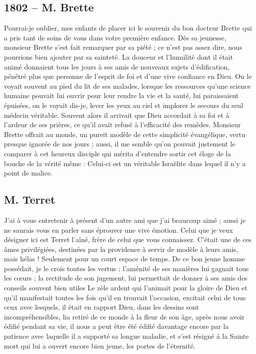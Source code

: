 \documentclass[11pt,a4paper]{report}
\begin{document}
\subsection*{1802 -- M. Brette}

Pourrai-je oublier, mes enfants de placer ici le souvenir du bon docteur Brette qui a pris tant de soins de vous dans votre première enfance. Dès sa jeunesse, monsieur Brette s'est fait remarquer par sa piété ; ce n'est pas assez dire, nous pourrions bien ajouter par sa sainteté. La douceur et l'humilité dont il était animé donnaient tous les jours à ses amis de nouveaux sujets d'édification, pénétré plus que personne de l'esprit de foi et d'une vive confiance en Dieu. On le voyait souvent au pied du lit de ses malades, lorsque les ressources qu'une science humaine pouvait lui ouvrir pour leur rendre la vie et la santé, lui paraissaient épuisées, on le voyait dis-je, lever les yeux au ciel et implorer le secours du seul médecin véritable. Souvent alors il arrivait que Dieu accordait à sa foi et à l'ardeur de ses prières, ce qu'il avait refusé à l'efficacité des remèdes. Monsieur Brette offrait au monde, un pureit modèle de cette simplicité évangélique, vertu presque ignorée de nos jours ; aussi, il me semble qu'on pouvait justement le comparer à cet heureux disciple qui mérita d'entendre sortir cet éloge de la bouche de la vérité même : Celui-ci est un véritable Israëlite dans lequel il n'y a point de malice.

\subsection*{M. Terret}

J'ai à vous entretenir à présent d'un autre ami que j'ai beaucoup aimé ; aussi je ne saurais vous en parler sans éprouver une vive émotion. Celui que je veux désigner ici est Terret l'aîné, frère de celui que vous connaissez. C'était une de ces âmes privilégiées, destinées par la providence à servir de modèle à leurs amis, mais hélas ! Seulement pour un court espace de temps. De ce bon jeune homme possédait, je le crois toutes les vertus ; l'aménité de ses manières lui gagnait tous les cœurs ; la rectitude de son jugement, lui permettait de donner à ses amis des conseils souvent bien utiles Le zèle ardent qui l'animait pour la gloire de Dieu et qu'il manifestait toutes les fois qu'il en trouvait l'occasion, excitait celui de tous ceux avec lesquels, il était en rapport Dieu, dans les dessins sont incompréhensibles, lia retiré de ce monde à la fleur de son âge, après nous avoir édifié pendant sa vie, il nous a peut être été édifié davantage encore par la patience avec laquelle il a supporté sa longue maladie, et s'est résigné à la Sainte mort qui lui a ouvert encore bien jeune, les portes de l'éternité.
\end{document}
